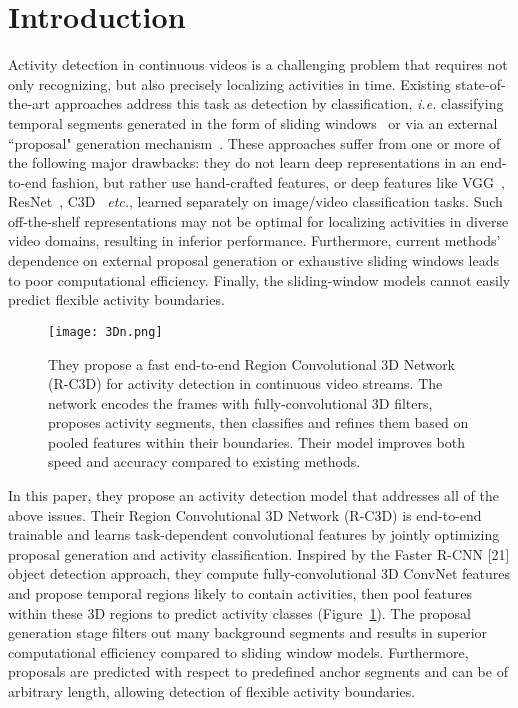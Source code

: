 \documentclass[10pt,twocolumn,letterpaper]{article}
\begin{document}
\section{Introduction}
Activity detection in continuous videos is a challenging problem that requires not only recognizing, but also precisely localizing activities in time. Existing state-of-the-art approaches address this task as detection by classification, \emph{i.e.} classifying temporal segments generated in the form of sliding windows~\cite{name13,name20} or via an external ``proposal" generation mechanism~\cite{name35}. These approaches suffer from one or more of the following major drawbacks: they do not learn deep representations in an end-to-end fashion, but rather use hand-crafted features, or deep features like VGG~\cite{name28}, ResNet~\cite{name8}, C3D~\cite{name32} \emph{etc.}, learned separately on image/video classification tasks. Such off-the-shelf representations may not be optimal for localizing activities in diverse video domains, resulting in inferior performance. Furthermore, current methods' dependence on external proposal generation or exhaustive sliding windows leads to poor computational efficiency. Finally, the sliding-window models cannot easily predict flexible activity boundaries.
  \begin{figure}[!htb]
  	\centering
  	\texttt{[image: 3Dn.png]}\\
  	\caption{They propose a fast end-to-end Region Convolutional
  		3D Network (R-C3D) for activity detection in continuous video
  		streams. The network encodes the frames with fully-convolutional
  		3D filters, proposes activity segments, then classifies and refines
  		them based on pooled features within their boundaries. Their model
  		improves both speed and accuracy compared to existing methods.}\label{Figure1} 
  \end{figure}
\par In this paper, they propose an activity detection model that addresses all of the above issues. Their Region Convolutional 3D Network (R-C3D) is end-to-end trainable and learns task-dependent convolutional features by jointly optimizing proposal generation and activity classification. Inspired by the Faster R-CNN [21] object detection approach,
they compute fully-convolutional 3D ConvNet features and propose temporal regions likely to contain activities, then pool features within these 3D regions to predict activity classes (Figure~\ref{Figure1}). The proposal generation stage filters out many background segments and results in superior computational efficiency compared to sliding window models.
Furthermore, proposals are predicted with respect to predefined anchor segments and can be of arbitrary length, allowing detection of flexible activity boundaries.
\end{document}
